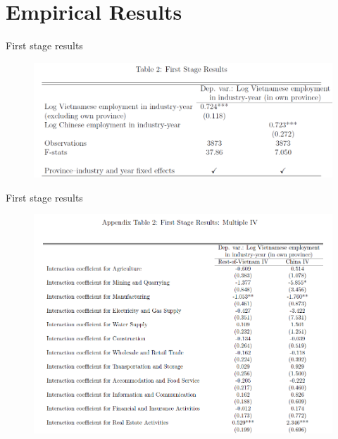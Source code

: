 \documentclass{beamer}
\begin{document}
\section{Empirical Results}

\begin{frame}{First stage results}

\begin{figure}
\centering
\includegraphics[width=1\linewidth]{8.png}
\end{figure}

\end{frame}

\begin{frame}{First stage results}

\begin{figure}
\centering
\includegraphics[width=1\linewidth]{9-1.png}
\end{figure}

\end{frame}
\end{document}

